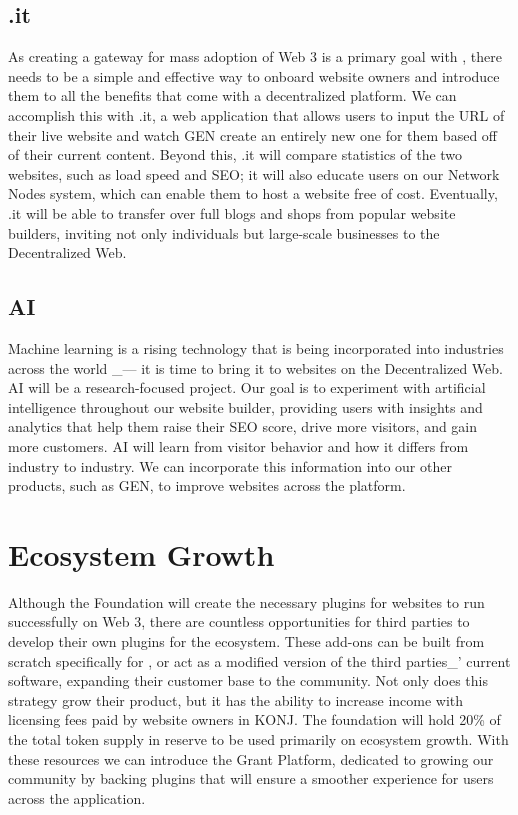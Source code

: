\documentclass{kwp-builder}
\begin{document}
\subsection{\konjure.it}

\tab As creating a gateway for mass adoption of Web 3 is a primary goal with \konjure, there needs to be a simple and effective way to onboard website owners and introduce them to all the benefits that come with a decentralized platform. We can accomplish this with \konjure.it, a web application that allows users to input the URL of their live website and watch \konjure GEN create an entirely new one for them based off of their current content. Beyond this, \konjure.it will compare statistics of the two websites, such as load speed and SEO; it will also educate users on our Network Nodes system, which can enable them to host a website free of cost. Eventually, \konjure.it will be able to transfer over full blogs and shops from popular website builders, inviting not only individuals but large-scale businesses to the Decentralized Web.

\newpage

\subsection{\konjure AI}

\tab Machine learning is a rising technology that is being incorporated into industries across the world \_{—} it is time to bring it to websites on the Decentralized Web. \konjure AI will be a research-focused project. Our goal is to experiment with artificial intelligence throughout our website builder, providing users with insights and analytics that help them raise their SEO score, drive more visitors, and gain more customers. \konjure AI will learn from visitor behavior and how it differs from industry to industry. We can incorporate this information into our other products, such as \konjure GEN, to improve websites across the platform.


\section{Ecosystem Growth}

\tab Although the \konjure Foundation will create the necessary plugins for websites to run successfully on Web 3, there are countless opportunities for third parties to develop their own plugins for the ecosystem. These add-ons can be built from scratch specifically for \konjure, or act as a modified version of the third parties\_{’} current software, expanding their customer base to the \konjure community. Not only does this strategy grow their product, but it has the ability to increase income with licensing fees paid by website owners in KONJ. The foundation will hold 20\% of the total token supply in reserve to be used primarily on ecosystem growth. With these resources we can introduce the \konjure Grant Platform, dedicated to growing our community by backing plugins that will ensure a smoother experience for users across the application.
\end{document}
